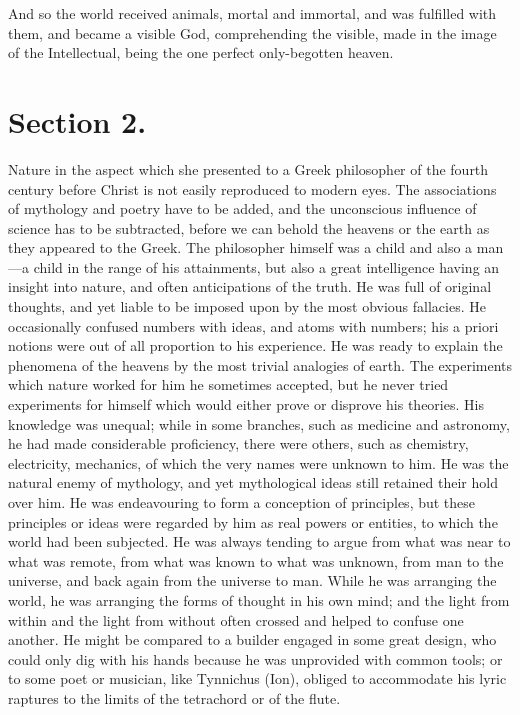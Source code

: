 \documentclass[11pt,letter]{article}
\begin{document}
\par  And so the world received animals, mortal and immortal, and was fulfilled with them, and became a visible God, comprehending the visible, made in the image of the Intellectual, being the one perfect only-begotten heaven.

\par 
\section{
      Section 2.
    }
\par  Nature in the aspect which she presented to a Greek philosopher of the fourth century before Christ is not easily reproduced to modern eyes. The associations of mythology and poetry have to be added, and the unconscious influence of science has to be subtracted, before we can behold the heavens or the earth as they appeared to the Greek. The philosopher himself was a child and also a man—a child in the range of his attainments, but also a great intelligence having an insight into nature, and often anticipations of the truth. He was full of original thoughts, and yet liable to be imposed upon by the most obvious fallacies. He occasionally confused numbers with ideas, and atoms with numbers; his a priori notions were out of all proportion to his experience. He was ready to explain the phenomena of the heavens by the most trivial analogies of earth. The experiments which nature worked for him he sometimes accepted, but he never tried experiments for himself which would either prove or disprove his theories. His knowledge was unequal; while in some branches, such as medicine and astronomy, he had made considerable proficiency, there were others, such as chemistry, electricity, mechanics, of which the very names were unknown to him. He was the natural enemy of mythology, and yet mythological ideas still retained their hold over him. He was endeavouring to form a conception of principles, but these principles or ideas were regarded by him as real powers or entities, to which the world had been subjected. He was always tending to argue from what was near to what was remote, from what was known to what was unknown, from man to the universe, and back again from the universe to man. While he was arranging the world, he was arranging the forms of thought in his own mind; and the light from within and the light from without often crossed and helped to confuse one another. He might be compared to a builder engaged in some great design, who could only dig with his hands because he was unprovided with common tools; or to some poet or musician, like Tynnichus (Ion), obliged to accommodate his lyric raptures to the limits of the tetrachord or of the flute.
\end{document}
